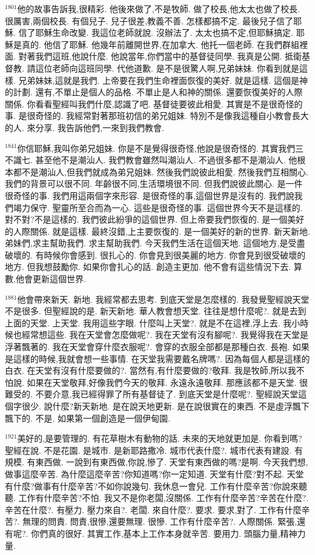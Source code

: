 \documentclass{book}
\begin{document}
$^{1801}$他的故事告訴我,很精彩.
他後來做了,不是牧師.
做了校長,他太太也做了校長.
很厲害,兩個校長.
有個兒子.
兒子很差,教義不善.
怎樣都搞不定.
最後兒子信了耶穌.
信了耶穌生命改變.
我這位老師就說.
沒辦法了.
太太也搞不定,但耶穌搞定.
耶穌是真的.
他信了耶穌.
他幾年前離開世界,在加拿大.
他托一個老師.
在我們群組裡面.
對著我們這班,他說什麼.
他說當年,你們當中的基督徒同學.
我真是公開.
抵衛基督教.
請這位老師向這班同學.
代他道歉.
是不是很驚人啊,兄弟妹妹.
你看到就是這樣.
兄弟妹妹,這就是我們.
上帝要在我們生命裡面恢復的美好.
就是這樣.
這個是神的計劃.
還有,不單止是個人的品格.
不單止是人和神的關係.
還要恢復美好的人際關係.
你看看聖經叫我們什麼,認識了吧.
基督徒要彼此相愛.
其實是不是很奇怪的事.
是很奇怪的.
我經常對著那班初信的弟兄姐妹.
特別不是像我這種自小教會長大的人.
來分享.
我告訴他們,一來到我們教會.

$^{1841}$你信耶穌,我叫你弟兄姐妹.
你是不是覺得很奇怪,他說是很奇怪的.
其實我們三不識七.
甚至他不是潮汕人.
我們教會雖然叫潮汕人.
不過很多都不是潮汕人.
他根本都不是潮汕人,但我們就成為弟兄姐妹.
然後我們說彼此相愛.
然後我們互相關心.
我們的背景可以很不同.
年齡很不同,生活環境很不同.
但我們說彼此關心.
是一件很奇怪的事.
我們用這兩個字來形容.
是很奇怪的事,這個世界是沒有的.
我們說我們竭力保守.
聖靈所至合而為一心.
這些是很奇怪的事.
這個世界今天不是這樣的.
對不對?不是這樣的.
我們彼此紛爭的這個世界.
但上帝要我們恢復的.
是一個美好的人際關係.
就是這樣.
最終沒錯,上主要恢復的.
是一個美好的新的世界.
新天新地.
弟妹們,求主幫助我們.
求主幫助我們.
今天我們生活在這個天地.
這個地方,是受盡破壞的.
有時候你會感到.
很扎心的.
你會見到很美麗的地方.
你會見到很受破壞的地方.
但我想鼓勵你.
如果你會扎心的話.
創造主更加.
他不會有這些情況下去.
算數,他會更新這個世界.

$^{1881}$他會帶來新天.
新地.
我經常都去思考.
到底天堂是怎麼樣的.
我發覺聖經說天堂不是很多.
但聖經說的是.
新天新地.
華人教會想天堂.
往往是想什麼呢?.
就是去到上面的天堂.
上天堂.
我用這些字眼.
什麼叫上天堂?.
就是不在這裡,浮上去.
我小時候也經常想這些.
我在天堂會怎麼做呢?.
我在天堂有沒有腳呢?.
我覺得我在天堂是浮著飄著的.
我在天堂會穿什麼衣服呢?.
會穿的衣服全部都是那種白衣.
長袍.
如果是這樣的時候,我就會想一些事情.
在天堂我需要戴名牌嗎?.
因為每個人都是這樣的白衣.
在天堂有沒有什麼要做的?.
當然有,有什麼要做的?敬拜.
我是牧師,所以我不怕說.
如果在天堂敬拜,好像我們今天的敬拜.
永遠永遠敬拜.
那應該都不是天堂.
很難受的.
不要介意,我已經得罪了所有基督徒了.
到底天堂是什麼呢?.
聖經說天堂這個字很少.
說什麼?新天新地.
是在說天地更新.
是在說很實在的東西.
不是虛浮飄下飄下的.
不是.
如果第一個創造是一個伊甸園.

$^{1921}$美好的,是要管理的.
有花草樹木有動物的話.
未來的天地就更加是.
你看到嗎?聖經在說.
不是花園.
是城市.
是新耶路撒冷.
城市代表什麼?.
城市代表有建設.
有規模.
有東西做.
一說到有東西做,你說,慘了.
天堂有東西做的嗎?是啊.
今天我們想,做事這麼辛苦.
為什麼這麼辛苦?你知道嗎?你一定知道.
天堂有什麼?對不起.
天堂有什麼?做事有什麼辛苦?不如你說幾句.
我休息一會兒.
工作有什麼辛苦?你說來聽聽.
工作有什麼辛苦?不怕.
我又不是你老闆,沒關係.
工作有什麼辛苦?辛苦在什麼?.
辛苦在什麼?.
有壓力.
壓力來自?.
老闆.
來自什麼?.
要求.
要求,對了.
工作有什麼辛苦?.
無理的問責.
問責,很慘,還要無理.
很慘.
工作有什麼辛苦?.
人際關係.
緊張,還有呢?.
你們真的很好.
其實工作,基本上工作本身就辛苦.
要用力.
頭腦力量,精神力量.
\end{document}
